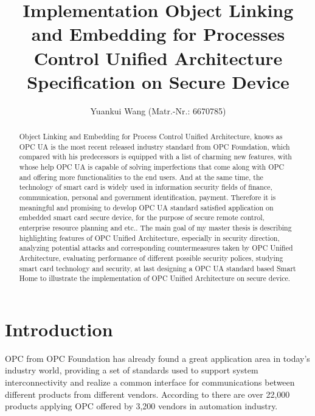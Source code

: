 \documentclass[]{llncs}
\begin{document}
\title{Implementation Object Linking and Embedding for Processes Control Unified Architecture Specification on Secure Device} %
\author{Yuankui Wang (Matr.-Nr.: 6670785)}

\maketitle

\begin{abstract}

Object Linking and Embedding for Process Control Unified Architecture, knows as OPC UA is the most recent released industry standard from OPC Foundation, which compared with his predecessors is equipped with a list of charming new features, with whose help OPC UA is capable of solving imperfections that come along with OPC and offering more functionalities to the end users. And at the same time, the technology of smart card is widely used in information security fields of finance, communication, personal and government identification, payment. Therefore it is meaningful and promising to develop OPC UA standard satisfied application on embedded smart card secure device, for the purpose of secure remote control, enterprise resource planning and etc.. The main goal of my master thesis is describing highlighting features of OPC Unified Architecture, especially in security direction, analyzing potential attacks and corresponding countermeasures taken by OPC Unified Architecture, evaluating performance of different possible security polices, studying smart card technology and security, at last designing a OPC UA standard based Smart Home to illustrate the implementation of OPC Unified Architecture on secure device. 

\end{abstract}

\section{Introduction}

OPC from OPC Foundation has already found a great application area in today’s industry world, providing a set of standards used to support system interconnectivity and realize a common interface for communications between different products from different vendors. According to \cite{Ref1} there are over 22,000 products applying OPC offered by 3,200 vendors in automation industry.
\end{document}
